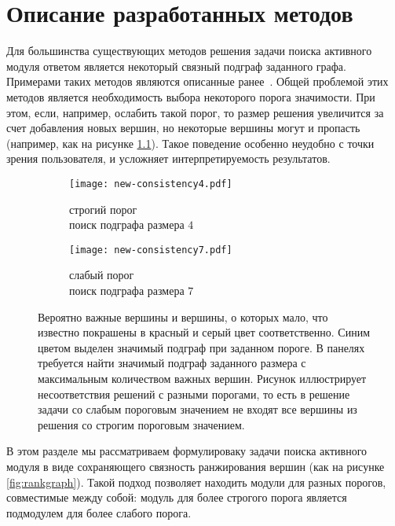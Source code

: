 \chapter{Описание разработанных методов}

Для большинства существующих методов решения задачи поиска активного модуля
ответом является некоторый связный подграф заданного графа. Примерами таких
методов являются описанные
ранее~\cite{Ideker2002,Dittrich2008a,Alcaraz2012,Sergushichev2016}.  Общей
проблемой этих методов является необходимость выбора некоторого порога
значимости. При этом, если, например, ослабить такой порог, то размер решения
увеличится за счет добавления новых вершин, но некоторые вершины могут
и пропасть (например, как на рисунке \ref{fig:consistency}). Такое поведение
особенно неудобно с точки зрения пользователя, и усложняет интерпретируемость
результатов.
\begin{figure}
    \begin{subfigure}{.45\textwidth}
        \centering
        \texttt{[image: new-consistency4.pdf]}
        \caption{строгий порог\\поиск подграфа размера $4$}
    \end{subfigure} %
    \begin{subfigure}{.45\textwidth}
        \centering
        \texttt{[image: new-consistency7.pdf]}
        \caption{слабый порог\\поиск подграфа размера $7$}
    \end{subfigure}
    \centering
    \caption{
        Вероятно важные вершины и вершины, о которых мало, что известно покрашены
        в красный и серый цвет соответственно.  Синим цветом выделен значимый
        подграф при заданном пороге.  В панелях требуется найти значимый
        подграф заданного размера с максимальным количеством важных вершин.
        Рисунок иллюстрирует несоответствия решений с разными порогами, то есть
        в решение задачи со слабым пороговым значением не входят все вершины из
        решения со строгим пороговым значением.
    }
    \label{fig:consistency}%
\end{figure}

В этом разделе мы рассматриваем формулироваку задачи поиска активного 
модуля в виде сохраняющего связность ранжирования вершин (как на рисунке \ref{fig:rankgraph}).
Такой подход позволяет находить модули для разных порогов, 
совместимые между собой: модуль для более строгого порога
является подмодулем для более слабого порога.






